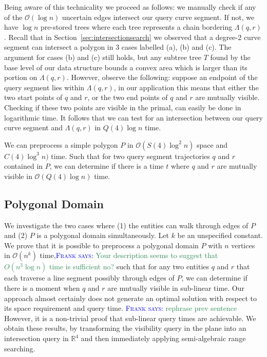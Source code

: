 \documentclass[UKenglish]{lipics-v2019}
\newcommand{\myremark}[4]{\textcolor{blue}{\textsc{#1 #2:}} \textcolor{#4}{\textsf{#3}}}
\newcommand{\frank}[2][says]{\myremark{Frank}{#1}{#2}{SeaGreen}}
\begin{document}
%
Being aware of this technicality we proceed as follows: we manually check if any of the $\mathcal{O}(\log n)$ uncertain edges intersect our query curve segment. If not, we have $\log n$ pre-stored trees where each tree represents a chain bordering $\Lambda(q,r)$. Recall that in Section~\ref{sec:intersectionsearch} we observed that a degree-2 curve segment can intersect a polygon in 3 cases labelled (a), (b) and (c). The argument for cases (b) and (c) still holds, but any subtree tree $T$ found by the base level of our data structure bounds a convex area which is larger than its portion on $\Lambda(q,r)$. However, observe the following: suppose an endpoint of the query segment lies within $\Lambda(q,r)$, in our application this means that either the two start points of $q$ and $r$, or the two end points of $q$ and $r$ are mutually visible. Checking if these two points are visible in the primal, can easily be done in logarithmic time. It follows that we can test for an intersection between our query curve segment and $\Lambda(q,r)$ in $Q(4) \log n$ time.

\begin{theorem}
    We can preprocess a simple polygon $P$ in $\mathcal{O}(S(4)\log^2 n)$ space and $C(4) \log^3 n)$ time. Such that for two query segment trajectories $q$ and $r$ contained in $P$, we can determine if there is a time $t$ where $q$ and $r$ are mutually visible in $\mathcal{O}(Q(4) \log n)$ time.
\end{theorem}

\subsection{Polygonal Domain}
\label{sub:Polygonal_Domain}

We investigate the two cases where (1) the entities can walk through
edges of $P$ and (2) $P$ is a polygonal domain simultaneously. Let $k$
be an unspecified constant. We prove that it is possible to preprocess
a polygonal domain $P$ with $n$ vertices in $\mathcal{O}(n^k)$
time,\frank{Your description seems to suggest that $O(n^3\log n)$ time
is sufficient no?}
such that for any two entities $q$ and $r$ that each traverse a line
segment possibly through edges of $P$, we can determine if there is a
moment when $q$ and $r$ are mutually visible in sub-linear time. Our
approach almost certainly does not generate an optimal solution with
respect to its space requirement and query time. \frank{rephrase prev sentence} However, it is a
non-trivial proof that sub-linear query times are achievable. We
obtain these results, by transforming the visibility query in the
plane into an intersection query in $\mathbb{R}^4$ and then
immediately applying semi-algebraic range searching.
\end{document}
